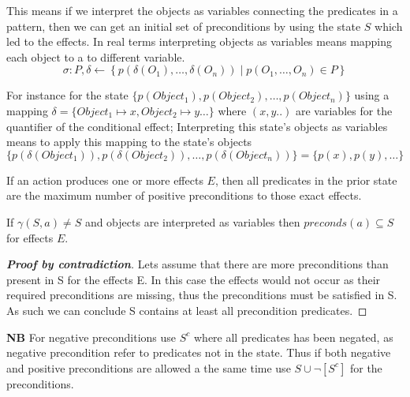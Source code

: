 \documentclass[\master/Master.tex]{subfiles}
\begin{document}
This means if we interpret the objects as variables connecting the predicates in a pattern, then we can get an initial set of preconditions by using the state $S$ which led to the effects. In real terms interpreting objects as variables means mapping each object 
to a to different variable.
\begin{equation*}
	\sigma : P, \delta \leftarrow \left\{p\left(\delta(O_1),\ldots,\delta(O_n) \right) \mid p(O_1,\ldots,O_n) \in P  \right\}
\end{equation*}



For instance for the state
$\{ p(Object_1), p(Object_2),\ldots,p(Object_n)\}$ using a mapping
$\delta = \{Object_1 \mapsto x, Object_2 \mapsto y \ldots\}$
where $(x, y..)$ are variables for the quantifier of the conditional effect; Interpreting this state's objects as variables means to apply this mapping to the state's objects
\begin{equation*}
\{ p(\delta(Object_1)), p(\delta(Object_2)),\ldots,p(\delta(Object_n))\} = \{ p(x), p(y),\ldots\}
\end{equation*}

\begin{theorem}\label{thm:ca:precondition-state}
If an action produces one or more effects $E$, then all predicates in the prior state are the maximum number of positive preconditions to those exact effects.

If $\gamma (S,a) \neq S$ and objects are interpreted as variables then $preconds(a) \subseteq S$  for effects $E$.

\begin{proof}[\textbf{Proof by contradiction}] Lets assume that there are more preconditions than present in S for the effects E.
	In this case the effects would not occur as their required preconditions are missing, thus the preconditions must be satisfied in S.
	As such we can conclude S contains at least all precondition predicates.
\end{proof}
\end{theorem}

\textbf{NB} For negative preconditions use $S^c$ where all predicates has been negated, as negative precondition refer to predicates not in the state.
Thus if both negative and positive preconditions are allowed a the same time use  $S \cup \neg[S^c] $ for the preconditions.
\end{document}

